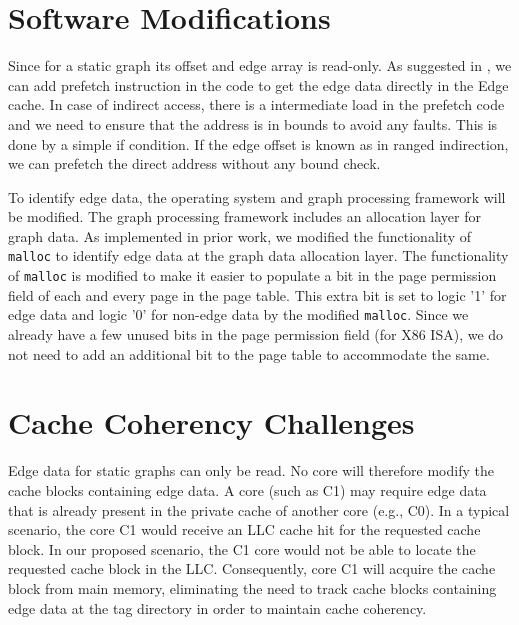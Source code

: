 \documentclass[a4paper,12pt, final]{report}
\begin{document}


\section{Software Modifications}
Since for a static graph its offset and edge array is read-only. As suggested in \cite{softPrefetch}, we can add prefetch instruction in the code to get the edge data directly in the Edge cache. In case of indirect access, there is a intermediate load in the prefetch code and we need to ensure that the address is in bounds to avoid any faults. This is done by a simple if condition. If the edge offset is known as in ranged indirection, we can prefetch the direct address without any bound check.

To identify edge data, the operating system and graph processing framework will be modified. The graph processing framework includes an allocation layer for graph data. As implemented in prior work\cite{grace}, we modified the functionality of \texttt{malloc} to identify edge data at the graph data allocation layer. The functionality of \texttt{malloc} is modified to make it easier to populate a bit in the page permission field of each and every page in the page table. This extra bit is set to logic '1' for edge data and logic '0' for non-edge data by the modified \texttt{malloc}. Since we already have a few unused bits in the page permission field (for X86 ISA), we do not need to add an additional bit to the page table to accommodate the same.

\section{Cache Coherency Challenges}
Edge data for static graphs can only be read. No core will therefore modify the cache blocks containing edge data. A core (such as C1) may require edge data that is already present in the private cache of another core (e.g., C0). In a typical scenario, the core C1 would receive an LLC cache hit for the requested cache block. In our proposed scenario, the C1 core would not be able to locate the requested cache block in the LLC. Consequently, core C1 will acquire the cache block from main memory, eliminating the need to track cache blocks containing edge data at the tag directory in order to maintain cache coherency.
\end{document}
